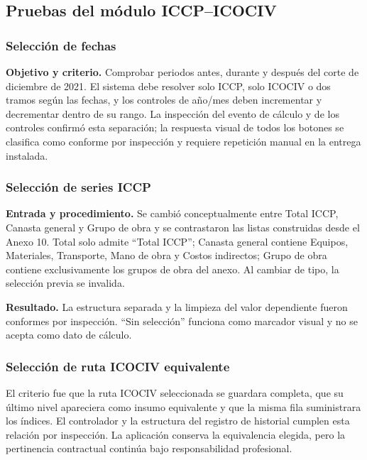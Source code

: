 \documentclass[12pt,letterpaper]{article}
\newcommand{\ICOCIV}{ICOCIV}
\newcommand{\ICCP}{ICCP}
\begin{document}
\subsection{Pruebas del módulo ICCP--ICOCIV}

\subsubsection{Selección de fechas}

\textbf{Objetivo y criterio.} Comprobar periodos antes, durante y después del corte de diciembre de 2021. El sistema debe resolver solo \ICCP, solo \ICOCIV{} o dos tramos según las fechas, y los controles de año/mes deben incrementar y decrementar dentro de su rango. La inspección del evento de cálculo y de los controles confirmó esta separación; la respuesta visual de todos los botones se clasifica como conforme por inspección y requiere repetición manual en la entrega instalada.

\subsubsection{Selección de series ICCP}

\textbf{Entrada y procedimiento.} Se cambió conceptualmente entre Total \ICCP, Canasta general y Grupo de obra y se contrastaron las listas construidas desde el Anexo 10. Total solo admite ``Total ICCP''; Canasta general contiene Equipos, Materiales, Transporte, Mano de obra y Costos indirectos; Grupo de obra contiene exclusivamente los grupos de obra del anexo. Al cambiar de tipo, la selección previa se invalida.

\textbf{Resultado.} La estructura separada y la limpieza del valor dependiente fueron conformes por inspección. ``Sin selección'' funciona como marcador visual y no se acepta como dato de cálculo.

\subsubsection{Selección de ruta ICOCIV equivalente}

El criterio fue que la ruta \ICOCIV{} seleccionada se guardara completa, que su último nivel apareciera como insumo equivalente y que la misma fila suministrara los índices. El controlador y la estructura del registro de historial cumplen esta relación por inspección. La aplicación conserva la equivalencia elegida, pero la pertinencia contractual continúa bajo responsabilidad profesional.
\end{document}
